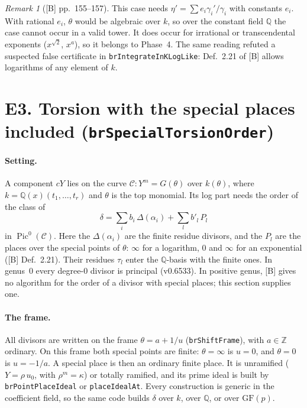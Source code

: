 \documentclass[11pt]{article}
\theoremstyle{definition}
\theoremstyle{remark}
\newtheorem{remark}[theorem]{Remark}
\newcommand{\Q}{\mathbb{Q}}
\newcommand{\Z}{\mathbb{Z}}
\newcommand{\code}[1]{\texttt{#1}}
\begin{document}
\begin{remark}[{[B] pp.~155--157}]
This case needs $\eta'=\sum e_i\gamma_i'/\gamma_i$ with constants $e_i$. With
rational $e_i$, $\theta$ would be algebraic over $k$, so over the constant
field $\Q$ the case cannot occur in a valid tower. It does occur for irrational
or transcendental exponents ($x^{\sqrt2}$, $x^a$), so it belongs to Phase~4.
The same reading refuted a suspected false certificate in
\code{brIntegrateInKLogLike}: Def.~2.21 of [B] allows logarithms of any element
of $k$.
\end{remark}

\section*{E3. Torsion with the special places included (\code{brSpecialTorsionOrder})}

\paragraph{Setting.} A component $cY$ lies on the curve $\mathcal C: Y^m=G(\theta)$
over $k(\theta)$, where $k=\Q(x)(t_1,\dots,t_r)$ and $\theta$ is the top monomial.
Its log part needs the order of the class of
\[ \delta=\sum_i b_i\,\Delta(\alpha_i)+\sum_l b'_l\,P_l \]
in $\operatorname{Pic}^0(\mathcal C)$. Here the $\Delta(\alpha_i)$ are the finite
residue divisors, and the $P_l$ are the places over the special points of
$\theta$: $\infty$ for a logarithm, $0$ and $\infty$ for an exponential
([B] Def.~2.21). Their residues $\tau_l$ enter the $\Q$-basis with the finite
ones. In genus~0 every degree-0 divisor is principal (v0.6533). In positive
genus, [B] gives no algorithm for the order of a divisor with special places;
this section supplies one.

\paragraph{The frame.} All divisors are written on the frame $\theta=a+1/u$
(\code{brShiftFrame}), with $a\in\Z$ ordinary. On this frame both special points
are finite: $\theta=\infty$ is $u=0$, and $\theta=0$ is $u=-1/a$. A special
place is then an ordinary finite place. It is unramified ($Y=\rho\,u_0$, with
$\rho^m=\kappa$) or totally ramified, and its prime ideal is built by
\code{brPointPlaceIdeal} or \code{placeIdealAt}. Every construction is generic
in the coefficient field, so the same code builds $\delta$ over $k$, over
$\Q$, or over $\mathrm{GF}(p)$.
\end{document}
